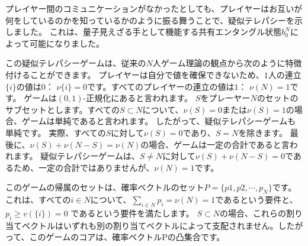 プレイヤー間のコミュニケーションがなかったとしても、プレイヤーはお互いが何をしているのかを知っているかのように振る舞うことで、疑似テレパシーを示しました。
これは、量子見えざる手として機能する共有エンタングル状態$b_0^N$によって可能になりました。

この疑似テレパシーゲームは、従来の$N$人ゲーム理論の観点から次のように特徴付けることができます。 プレイヤーは自分で値を確保できないため、$1$人の連立$ \{ i \}$の値は$0$： $\nu \{ i \} = 0$です。すべてのプレイヤーの連立の値は$1$： $\nu(N)= 1$です。 ゲームは$(0,1)$-正規化にあると言われます。 $S$をプレーヤー$N$のセットのサブセットとします。すべての$S \subset N$について、$\nu (S) = 0$または$\nu (S) = 1$の場合、ゲームは単純であると言われます。
したがって、疑似テレパシーゲームも単純です。 実際、すべての$S$に対して$\nu (S)= 0$であり、$S = N$を除きます。
最後に、$\nu (S) + \nu (N - S) = \nu (N)$の場合、ゲームは一定の合計であると言われます。
疑似テレパシーゲームは、$S \ne N $に対して$ \nu (S) + \nu (N-S) =0$であるため、一定の合計ではありませんが、$\nu (N) =1$です。

このゲームの帰属のセットは、確率ベクトルのセット$P = \{ p1, p2, \cdots , p_N \}$です。
これは、すべての$i \in N$について、$ \sum_{i \in N} p_i = \nu(N) =1 $であるという要件と、$p_i \ge v( \{ i \})  = 0 $ であるという要件を満たします。
$S \subset N$の場合、これらの割り当てベクトルはいずれも別の割り当てベクトルによって支配されません。したがって、このゲームのコアは、確率ベクトルPの凸集合です。

